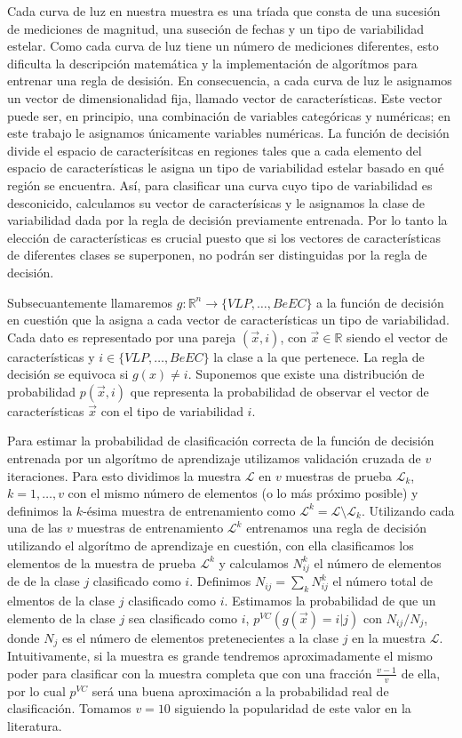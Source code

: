 \documentclass[letterpaper,12pt]{book}
\begin{document}
Cada curva de luz en nuestra muestra es una tríada que consta de una sucesión de mediciones de magnitud, una suseción de fechas y un tipo de variabilidad estelar. Como cada curva de luz tiene un número de mediciones diferentes, esto dificulta la descripción matemática y la implementación de algorítmos para entrenar una regla de desisión. En consecuencia, a cada curva de luz le asignamos un vector de dimensionalidad fija, llamado vector de características. Este vector puede ser, en principio, una combinación de variables categóricas y numéricas; en este trabajo le asignamos únicamente variables numéricas. La función de decisión divide el espacio de caracterísitcas en regiones tales que a cada elemento del espacio de características le asigna un tipo de variabilidad estelar basado en qué región se encuentra. Así, para clasificar una curva cuyo tipo de variabilidad es desconicido, calculamos su vector de caracterísicas y le asignamos la clase de variabilidad dada por la regla de decisión previamente entrenada. Por lo tanto la elección de características es crucial puesto que si los vectores de características de diferentes clases se superponen, no podrán ser distinguidas por la regla de decisión.

Subsecuantemente llamaremos $g:\mathbb{R}^{n}\rightarrow \{VLP,\dots, BeEC\}$ a la función de decisión en cuestión que la asigna a cada vector de características un tipo de variabilidad. Cada dato es representado por una pareja $(\vec{x}, i)$, con $\vec{x}\in\mathbb{R}$ siendo el vector de características y $i\in\{VLP,\dots, BeEC\}$ la clase a la que pertenece. La regla de decisión se equivoca si  $g(x)\neq i$. Suponemos que existe una distribución de probabilidad $p(\vec{x},i)$ que representa la probabilidad de observar el vector de características $\vec{x}$ con el tipo de variabilidad $i$.

Para estimar la probabilidad de clasificación correcta de la función de decisión entrenada por un algorítmo de aprendizaje utilizamos validación cruzada de $v$ iteraciones. Para esto dividimos la muestra $\mathcal{L}$ en $v$ muestras de prueba $\mathcal{L}_{k}$, $k=1,\dots,v$ con el mismo número de elementos (o lo más próximo posible) y definimos la $k$-ésima muestra de entrenamiento como $\mathcal{L}^{k} = \mathcal{L}\setminus \mathcal{L}_{k}$. Utilizando cada una de las $v$ muestras de entrenamiento $\mathcal{L}^{k}$  entrenamos una regla de decisión utilizando el algorítmo de aprendizaje en cuestión, con ella clasificamos los elementos de la muestra de prueba $\mathcal{L}^{k}$ y calculamos $N_{ij}^{k}$ el número de elementos de de la clase $j$ clasificado como $i$. Definimos $N_{ij}=\sum_{k}N_{ij}^{k}$ el número total de elmentos de la clase $j$ clasificado como $i$. Estimamos la probabilidad de que un elemento de la clase $j$ sea clasificado como $i$, $p^{VC}(g(\vec{x})=i|j)$ con $N_{ij}/N_{j}$, donde $N_{j}$ es el número de elementos pretenecientes a la clase $j$ en la muestra $\mathcal{L}$. Intuitivamente, si la muestra es grande tendremos aproximadamente el mismo poder para clasificar con la muestra completa que con una fracción $\frac{v-1}{v}$ de ella, por lo cual $p^{VC}$ será una buena aproximación a la probabilidad real de clasificación. Tomamos $v=10$ siguiendo la popularidad de este valor en la literatura. 
\end{document}
